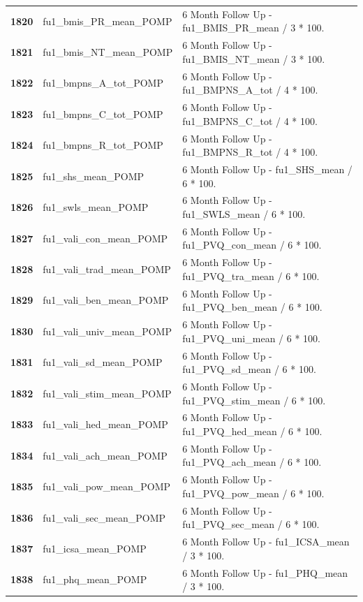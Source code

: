 \documentclass[
  letterpaper,
  DIV=11,
  numbers=noendperiod]{scrartcl}
\begin{document}
\begin{longtable}[t]{>{}cll}
\textbf{1820} & fu1\_bmis\_PR\_mean\_POMP & 6 Month Follow Up - fu1\_BMIS\_PR\_mean / 3 * 100.\\
\addlinespace
\textbf{1821} & fu1\_bmis\_NT\_mean\_POMP & 6 Month Follow Up - fu1\_BMIS\_NT\_mean / 3 * 100.\\
\textbf{1822} & fu1\_bmpns\_A\_tot\_POMP & 6 Month Follow Up - fu1\_BMPNS\_A\_tot / 4 * 100.\\
\textbf{1823} & fu1\_bmpns\_C\_tot\_POMP & 6 Month Follow Up - fu1\_BMPNS\_C\_tot / 4 * 100.\\
\textbf{1824} & fu1\_bmpns\_R\_tot\_POMP & 6 Month Follow Up - fu1\_BMPNS\_R\_tot / 4 * 100.\\
\textbf{1825} & fu1\_shs\_mean\_POMP & 6 Month Follow Up - fu1\_SHS\_mean / 6 * 100.\\
\addlinespace
\textbf{1826} & fu1\_swls\_mean\_POMP & 6 Month Follow Up - fu1\_SWLS\_mean / 6 * 100.\\
\textbf{1827} & fu1\_vali\_con\_mean\_POMP & 6 Month Follow Up - fu1\_PVQ\_con\_mean / 6 * 100.\\
\textbf{1828} & fu1\_vali\_trad\_mean\_POMP & 6 Month Follow Up - fu1\_PVQ\_tra\_mean / 6 * 100.\\
\textbf{1829} & fu1\_vali\_ben\_mean\_POMP & 6 Month Follow Up - fu1\_PVQ\_ben\_mean / 6 * 100.\\
\textbf{1830} & fu1\_vali\_univ\_mean\_POMP & 6 Month Follow Up - fu1\_PVQ\_uni\_mean / 6 * 100.\\
\addlinespace
\textbf{1831} & fu1\_vali\_sd\_mean\_POMP & 6 Month Follow Up - fu1\_PVQ\_sd\_mean / 6 * 100.\\
\textbf{1832} & fu1\_vali\_stim\_mean\_POMP & 6 Month Follow Up - fu1\_PVQ\_stim\_mean / 6 * 100.\\
\textbf{1833} & fu1\_vali\_hed\_mean\_POMP & 6 Month Follow Up - fu1\_PVQ\_hed\_mean / 6 * 100.\\
\textbf{1834} & fu1\_vali\_ach\_mean\_POMP & 6 Month Follow Up - fu1\_PVQ\_ach\_mean / 6 * 100.\\
\textbf{1835} & fu1\_vali\_pow\_mean\_POMP & 6 Month Follow Up - fu1\_PVQ\_pow\_mean / 6 * 100.\\
\addlinespace
\textbf{1836} & fu1\_vali\_sec\_mean\_POMP & 6 Month Follow Up - fu1\_PVQ\_sec\_mean / 6 * 100.\\
\textbf{1837} & fu1\_icsa\_mean\_POMP & 6 Month Follow Up - fu1\_ICSA\_mean / 3 * 100.\\
\textbf{1838} & fu1\_phq\_mean\_POMP & 6 Month Follow Up - fu1\_PHQ\_mean / 3 * 100.\\

\end{longtable}
\end{document}
